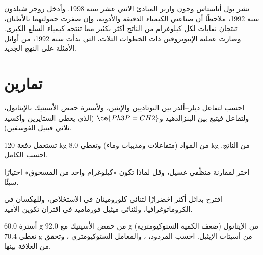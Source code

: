 \begin{history}
نشر بول أناستاس وجون وارنر المبادئ الاثني عشر  سنة 1998. وأدخل روجر شيلدون  سنة 1992، ملاحظًا أن
صناعتي الكيمياء الدقيقة والأدوية، وإن صغرت حمولتهما بالأطنان،
تنتجان نفايات لكل كيلوغرام من الناتج أكثر بكثير مما تنتجه كيمياء السلع الكبرى. وصارت
عملية الإيبوبروفين ذات الخطوات الثلاث، التي بدأت سنة 1992، من أوائل
الأمثلة على النهج الجديد.
\end{history}

\section{تمارين}

\begin{exercise}[$\star$]\label{exo:b3:green-industrial:1}
احسب  لتفاعل ديلز--ألدر بين البوتاديين والإيثين، ولأسترة
حمض الأسيتيك بالإيثانول، ولتفاعل فيتيغ بين
البنزالدهيد و$\ce{Ph3P=CH2}$ (الذي يعطي الستايرين وأكسيد ثلاثي فينيل الفوسفين).
\end{exercise}

\begin{exercise}[$\star$]\label{exo:b3:green-industrial:2}
تستعمل دفعة 120 kg من المواد (متفاعلات ومذيبات وماء) وتعطي 8.0 kg من
الناتج. احسب   الكامل.
\end{exercise}

\begin{exercise}[$\star$]\label{exo:b3:green-industrial:3}
اختر  لمقارنة منظّفي غسيل، وقل لماذا
تكون «كيلوغرام واحد من المسحوق» اختيارًا سيئًا.
\end{exercise}

\begin{exercise}[$\star$]\label{exo:b3:green-industrial:4}
اقترح بدائل أكثر اخضرارًا لثنائي كلوروميثان في الاستخلاص، وللهكسان في
الكروماتوغرافيا، ولثنائي ميثيل فورماميد في اقتران تكوين الأميد.
\end{exercise}

\begin{exercise}[$\star\star$]\label{exo:b3:green-industrial:5}
أسترة 60.0 g من حمض الأسيتيك مع 92.0 g من الإيثانول (ضعف
الكمية الستوكيومترية) تعطي 70.4 g من أسيتات الإيثيل. احسب المردود، ، والمعامل الستوكيومتري ، وتحقق من العلاقة
بينها.
\end{exercise}


